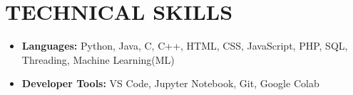 \section{TECHNICAL SKILLS} {
    \begin{itemize}[leftmargin=0.15in, label={}]
        \item{\textbf{\normalsize{Languages:}}{ \normalsize{Python, Java, C, C++, HTML, CSS, JavaScript, PHP, SQL, Threading, Machine Learning(ML)}}}
        \vspace{-0.3cm}
        \item{\textbf{\normalsize{Developer Tools:}}{ \normalsize{VS Code, Jupyter Notebook, Git, Google Colab}}}
    \end{itemize}
    \vspace{-10pt}
}